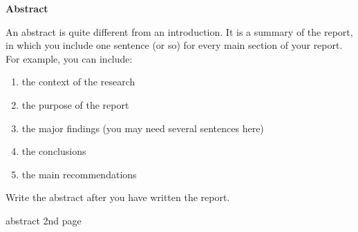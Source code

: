 \newpage
{}
\thispagestyle{plain}
\begin{center}
    \large
    \textbf{Abstract}
\end{center}

An abstract is quite different from an introduction. It is a summary of the report, in which you include one sentence (or so) for every main section of your report. For example, you can include:
\begin{enumerate}
\item
the context of the research
\item
the purpose of the report
\item
the major findings (you may need several sentences here)
\item
the conclusions
\item
the main recommendations
\end{enumerate}
Write the abstract after you have written the report.

\newpage
abstract 2nd page